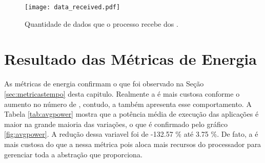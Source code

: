 \begin{figure}[h]
  \centering
  \caption{Quantidade de dados que o processo \master recebe dos \slaves.}
  \label{fig:datareceived}
  \texttt{[image: data\_received.pdf]}
\end{figure}

\clearpage

\section{Resultado das Métricas de Energia}
\label{sec:metricasenergia}

As métricas de energia confirmam o que foi observado na Seção \ref{sec:metricastempo} desta capitulo. Realmente a \API \ASYNC é mais custosa conforme o aumento no número de \clusters, contudo, a \IPC também apresenta esse comportamento. A Tabela \ref{tab:avgpower} mostra que a potência média de execução das aplicações é maior na grande maioria das variações, o que é confirmado pelo gráfico \ref{fig:avgpower}. A redução dessa variavel foi de -132.57 \% até 3.75 \%. De fato, a \ASYNC é mais custosa do que a \IPC nessa métrica pois aloca mais recursos do processador para gerenciar toda a abstração que proporciona.

\begin{table}[h]
\centering
\caption{Reduções ao comparar-se a potência média durante execução.}
\label{tab:avgpower}
\end{table}

